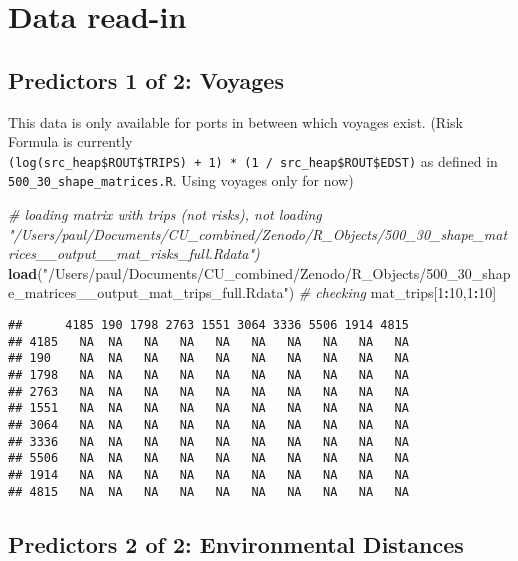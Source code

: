 \documentclass[]{article}
\newenvironment{Shaded}{\begin{snugshade}}{\end{snugshade}}
\newcommand{\KeywordTok}[1]{\textcolor[rgb]{0.13,0.29,0.53}{\textbf{#1}}}
\newcommand{\DecValTok}[1]{\textcolor[rgb]{0.00,0.00,0.81}{#1}}
\newcommand{\StringTok}[1]{\textcolor[rgb]{0.31,0.60,0.02}{#1}}
\newcommand{\CommentTok}[1]{\textcolor[rgb]{0.56,0.35,0.01}{\textit{#1}}}
\newcommand{\OperatorTok}[1]{\textcolor[rgb]{0.81,0.36,0.00}{\textbf{#1}}}
\newcommand{\NormalTok}[1]{#1}
\begin{document}
\section{Data read-in}\label{data-read-in}

\subsection{Predictors 1 of 2: Voyages}\label{predictors-1-of-2-voyages}

This data is only available for ports in between which voyages exist.
(Risk Formula is currently
\texttt{(log(src\_heap\$ROUT\$TRIPS)\ +\ 1)\ *\ (1\ /\ src\_heap\$ROUT\$EDST)}
as defined in \texttt{500\_30\_shape\_matrices.R}. Using voyages only
for now)

\begin{Shaded}
\begin{Highlighting}[]
\CommentTok{# loading matrix with trips (not risks), not loading "/Users/paul/Documents/CU_combined/Zenodo/R_Objects/500_30_shape_matrices__output__mat_risks_full.Rdata")}
\KeywordTok{load}\NormalTok{(}\StringTok{"/Users/paul/Documents/CU_combined/Zenodo/R_Objects/500_30_shape_matrices__output_mat_trips_full.Rdata"}\NormalTok{)}
\CommentTok{# checking }
\NormalTok{mat_trips[}\DecValTok{1}\OperatorTok{:}\DecValTok{10}\NormalTok{,}\DecValTok{1}\OperatorTok{:}\DecValTok{10}\NormalTok{]}
\end{Highlighting}
\end{Shaded}

\begin{verbatim}
##      4185 190 1798 2763 1551 3064 3336 5506 1914 4815
## 4185   NA  NA   NA   NA   NA   NA   NA   NA   NA   NA
## 190    NA  NA   NA   NA   NA   NA   NA   NA   NA   NA
## 1798   NA  NA   NA   NA   NA   NA   NA   NA   NA   NA
## 2763   NA  NA   NA   NA   NA   NA   NA   NA   NA   NA
## 1551   NA  NA   NA   NA   NA   NA   NA   NA   NA   NA
## 3064   NA  NA   NA   NA   NA   NA   NA   NA   NA   NA
## 3336   NA  NA   NA   NA   NA   NA   NA   NA   NA   NA
## 5506   NA  NA   NA   NA   NA   NA   NA   NA   NA   NA
## 1914   NA  NA   NA   NA   NA   NA   NA   NA   NA   NA
## 4815   NA  NA   NA   NA   NA   NA   NA   NA   NA   NA
\end{verbatim}

\subsection{Predictors 2 of 2: Environmental
Distances}\label{predictors-2-of-2-environmental-distances}
\end{document}
